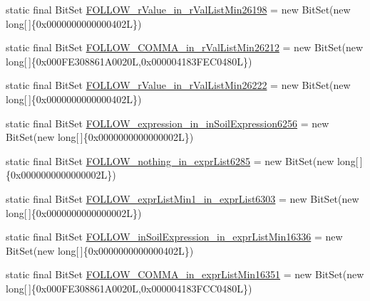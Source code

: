 \begin{DoxyCompactItemize}
\item 
static final Bit\-Set \hyperlink{classorg_1_1tzi_1_1use_1_1parser_1_1testsuite_1_1_test_suite_parser_a6d4beafd9f330c001b9790d49629155a}{F\-O\-L\-L\-O\-W\-\_\-r\-Value\-\_\-in\-\_\-r\-Val\-List\-Min26198} = new Bit\-Set(new long\mbox{[}$\,$\mbox{]}\{0x0000000000000402\-L\})
\item 
static final Bit\-Set \hyperlink{classorg_1_1tzi_1_1use_1_1parser_1_1testsuite_1_1_test_suite_parser_ad4152166b7d1e88d53e34e4d6245a953}{F\-O\-L\-L\-O\-W\-\_\-\-C\-O\-M\-M\-A\-\_\-in\-\_\-r\-Val\-List\-Min26212} = new Bit\-Set(new long\mbox{[}$\,$\mbox{]}\{0x000\-F\-E308861\-A0020\-L,0x000004183\-F\-E\-C0480\-L\})
\item 
static final Bit\-Set \hyperlink{classorg_1_1tzi_1_1use_1_1parser_1_1testsuite_1_1_test_suite_parser_a25106a3ed4ed4ff0461045090ecb115d}{F\-O\-L\-L\-O\-W\-\_\-r\-Value\-\_\-in\-\_\-r\-Val\-List\-Min26222} = new Bit\-Set(new long\mbox{[}$\,$\mbox{]}\{0x0000000000000402\-L\})
\item 
static final Bit\-Set \hyperlink{classorg_1_1tzi_1_1use_1_1parser_1_1testsuite_1_1_test_suite_parser_a1a80ce19aab3729aa1934c7d08b3ccf8}{F\-O\-L\-L\-O\-W\-\_\-expression\-\_\-in\-\_\-in\-Soil\-Expression6256} = new Bit\-Set(new long\mbox{[}$\,$\mbox{]}\{0x0000000000000002\-L\})
\item 
static final Bit\-Set \hyperlink{classorg_1_1tzi_1_1use_1_1parser_1_1testsuite_1_1_test_suite_parser_a4c811394da4bb274402203bacc554c12}{F\-O\-L\-L\-O\-W\-\_\-nothing\-\_\-in\-\_\-expr\-List6285} = new Bit\-Set(new long\mbox{[}$\,$\mbox{]}\{0x0000000000000002\-L\})
\item 
static final Bit\-Set \hyperlink{classorg_1_1tzi_1_1use_1_1parser_1_1testsuite_1_1_test_suite_parser_a8a945bc72cfe03fba2a56aae9a5f6ed5}{F\-O\-L\-L\-O\-W\-\_\-expr\-List\-Min1\-\_\-in\-\_\-expr\-List6303} = new Bit\-Set(new long\mbox{[}$\,$\mbox{]}\{0x0000000000000002\-L\})
\item 
static final Bit\-Set \hyperlink{classorg_1_1tzi_1_1use_1_1parser_1_1testsuite_1_1_test_suite_parser_a3554640479d723a5c8528afba2e50827}{F\-O\-L\-L\-O\-W\-\_\-in\-Soil\-Expression\-\_\-in\-\_\-expr\-List\-Min16336} = new Bit\-Set(new long\mbox{[}$\,$\mbox{]}\{0x0000000000000402\-L\})
\item 
static final Bit\-Set \hyperlink{classorg_1_1tzi_1_1use_1_1parser_1_1testsuite_1_1_test_suite_parser_a7f0035740c620a78a99558f8f9b54a87}{F\-O\-L\-L\-O\-W\-\_\-\-C\-O\-M\-M\-A\-\_\-in\-\_\-expr\-List\-Min16351} = new Bit\-Set(new long\mbox{[}$\,$\mbox{]}\{0x000\-F\-E308861\-A0020\-L,0x000004183\-F\-C\-C0480\-L\})

\end{DoxyCompactItemize}
